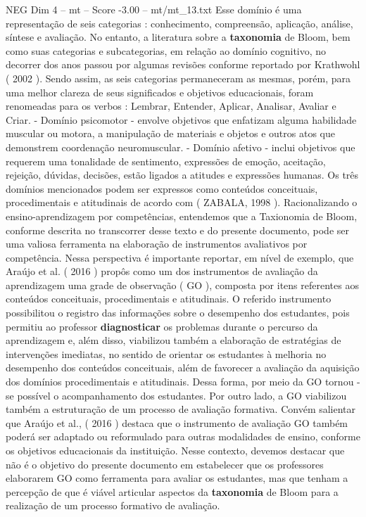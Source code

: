 \begin{textsample}{NEG Dim 4 – mt – Score -3.00 – mt/mt\_13.txt}
Esse domínio é uma representação de seis categorias : conhecimento, compreensão, aplicação, análise, síntese e avaliação.
No entanto, a literatura sobre a \textbf{taxonomia} de Bloom, bem como suas categorias e subcategorias, em relação ao domínio cognitivo, no decorrer dos anos passou por algumas revisões conforme reportado por Krathwohl ( 2002 ).
Sendo assim, as seis categorias permaneceram as mesmas, porém, para uma melhor clareza de seus significados e objetivos educacionais, foram renomeadas para os verbos : Lembrar, Entender, Aplicar, Analisar, Avaliar e Criar. - Domínio psicomotor - envolve objetivos que enfatizam alguma habilidade muscular ou motora, a manipulação de materiais e objetos e outros atos que demonstrem coordenação neuromuscular. - Domínio afetivo - inclui objetivos que requerem uma tonalidade de sentimento, expressões de emoção, aceitação, rejeição, dúvidas, decisões, estão ligados a atitudes e expressões humanas.
Os três domínios mencionados podem ser expressos como conteúdos conceituais, procedimentais e atitudinais de acordo com ( ZABALA, 1998 ).
Racionalizando o ensino-aprendizagem por competências, entendemos que a Taxionomia de Bloom, conforme descrita no transcorrer desse texto e do presente documento, pode ser uma valiosa ferramenta na elaboração de instrumentos avaliativos por competência.
Nessa perspectiva é importante reportar, em nível de exemplo, que Araújo et al. ( 2016 ) propôs como um dos instrumentos de avaliação da aprendizagem uma grade de observação ( GO ), composta por itens referentes aos conteúdos conceituais, procedimentais e atitudinais.
O referido instrumento possibilitou o registro das informações sobre o desempenho dos estudantes, pois permitiu ao professor \textbf{diagnosticar} os problemas durante o percurso da aprendizagem e, além disso, viabilizou também a elaboração de estratégias de intervenções imediatas, no sentido de orientar os estudantes à melhoria no desempenho dos conteúdos conceituais, além de favorecer a avaliação da aquisição dos domínios procedimentais e atitudinais.
Dessa forma, por meio da GO tornou -se possível o acompanhamento dos estudantes.
Por outro lado, a GO viabilizou também a estruturação de um processo de avaliação formativa.
Convém salientar que Araújo et al., ( 2016 ) destaca que o instrumento de avaliação GO também poderá ser adaptado ou reformulado para outras modalidades de ensino, conforme os objetivos educacionais da instituição.
Nesse contexto, devemos destacar que não é o objetivo do presente documento em estabelecer que os professores elaborarem GO como ferramenta para avaliar os estudantes, mas que tenham a percepção de que é viável articular aspectos da \textbf{taxonomia} de Bloom para a realização de um processo formativo de avaliação.

\end{textsample}
